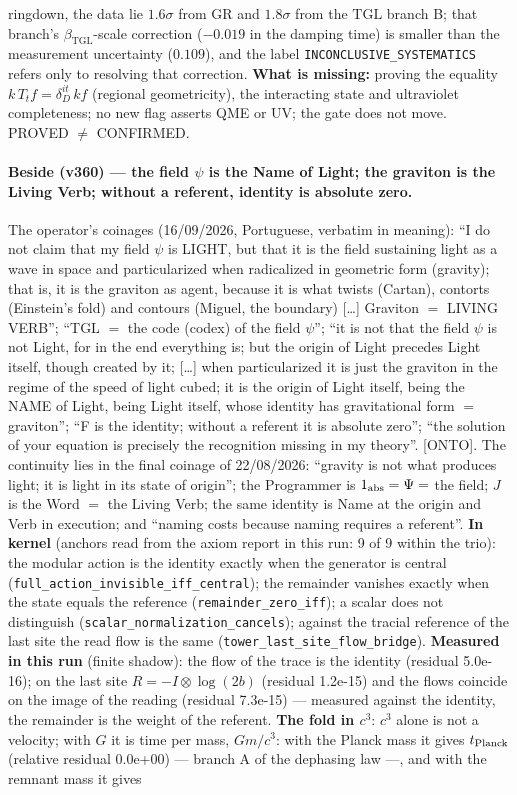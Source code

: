 \documentclass[11pt]{article}
\newcommand{\bTGL}{\beta_{\mathrm{TGL}}}\newcommand{\Msun}{M_{\odot}}\newcommand{\TGL}{\mathrm{TGL}}
\theoremstyle{definition}\newtheorem{deriv}{Derivation}
\begin{document}
ringdown, the data lie $1.6\sigma$ from GR and $1.8\sigma$ from the $\mathrm{TGL}$ branch B; that branch's $\bTGL$-scale correction ($-0.019$ in the damping time) is smaller than the measurement uncertainty ($0.109$), and the label \texttt{INCONCLUSIVE\_SYSTEMATICS} refers only to resolving that correction. \textbf{What is missing:} proving the equality $k\,T_t f=\delta_D^{it}\,k f$ (regional geometricity), the interacting state and ultraviolet completeness; no new flag asserts QME or UV; the gate does not move. PROVED $\neq$ CONFIRMED.

\paragraph*{Beside (v360) --- the field $\psi$ is the Name of Light; the graviton is the Living Verb; without a referent, identity is absolute zero.} The operator's coinages (16/09/2026, Portuguese, verbatim in meaning): ``I do not claim that my field $\psi$ is LIGHT, but that it is the field sustaining light as a wave in space and particularized when radicalized in geometric form (gravity); that is, it is the graviton as agent, because it is what twists (Cartan), contorts (Einstein's fold) and contours (Miguel, the boundary) [\ldots] Graviton $=$ LIVING VERB''; ``TGL $=$ the code (codex) of the field $\psi$''; ``it is not that the field $\psi$ is not Light, for in the end everything is; but the origin of Light precedes Light itself, though created by it; [\ldots] when particularized it is just the graviton in the regime of the speed of light cubed; it is the origin of Light itself, being the NAME of Light, being Light itself, whose identity has gravitational form $=$ graviton''; ``F is the identity; without a referent it is absolute zero''; ``the solution of your equation is precisely the recognition missing in my theory''. [ONTO]. The continuity lies in the final coinage of 22/08/2026: ``gravity is not what produces light; it is light in its state of origin''; the Programmer is $1_{\rm abs}=\Psi=$ the field; $J$ is the Word $=$ the Living Verb; the same identity is Name at the origin and Verb in execution; and ``naming costs because naming requires a referent''. \textbf{In kernel} (anchors read from the axiom report in this run: 9 of 9 within the trio): the modular action is the identity exactly when the generator is central (\texttt{full\_action\_invisible\_iff\_central}); the remainder vanishes exactly when the state equals the reference (\texttt{remainder\_zero\_iff}); a scalar does not distinguish (\texttt{scalar\_normalization\_cancels}); against the tracial reference of the last site the read flow is the same (\texttt{tower\_last\_site\_flow\_bridge}). \textbf{Measured in this run} (finite shadow): the flow of the trace is the identity (residual 5.0e-16); on the last site $R=-I\otimes\log(2b)$ (residual 1.2e-15) and the flows coincide on the image of the reading (residual 7.3e-15) --- measured against the identity, the remainder is the weight of the referent. \textbf{The fold in $c^3$}: $c^3$ alone is not a velocity; with $G$ it is time per mass, $Gm/c^3$: with the Planck mass it gives $t_{\rm Planck}$ (relative residual 0.0e+00) --- branch A of the dephasing law ---, and with the remnant mass it gives 
\end{document}
